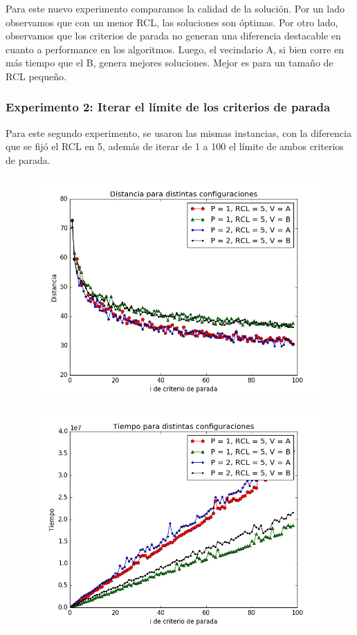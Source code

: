 Para este nuevo experimento comparamos la calidad de la solución. Por un lado observamos que con un menor RCL, las soluciones son óptimas. Por otro lado, observamos que los criterios de parada no generan una diferencia destacable en cuanto a performance en los algoritmos. Luego, el vecindario A, si bien corre en más tiempo que el B, genera mejores soluciones. Mejor es para un tamaño de RCL pequeño.


\subsubsection{Experimento 2: Iterar el límite de los criterios de parada}

Para este segundo experimento, se usaron las mismas instancias, con la diferencia que se fijó el RCL en 5, además de iterar de 1 a 100 el límite de ambos criterios de parada.


\begin{figure}[H]
    \begin{center}
      \includegraphics[width=0.7\columnwidth]{imagenes/Exp2DistanciaEj4.png}
    \end{center}
\end{figure}

\begin{figure}[H]
    \begin{center}
      \includegraphics[width=0.7\columnwidth]{imagenes/Exp2TiempoEj4.png}
    \end{center}
\end{figure}


